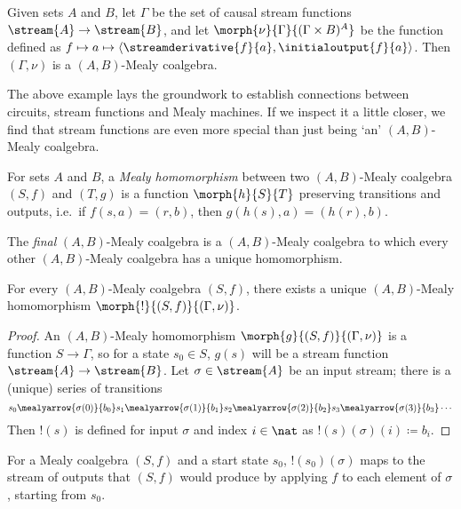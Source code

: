 \documentclass{lmcs}
\begin{document}
\begin{exa}
    Given sets \(A\) and \(B\), let \(\Gamma\) be the set of causal stream
    functions \(\stream{A} \to \stream{B}\), and let
    \(\morph{\nu}{\Gamma}{(\Gamma \times B)^A}\) be the function defined as \(
    f \mapsto a \mapsto \langle{
        \streamderivative{f}{a},\initialoutput{f}{a}
    }\rangle\).
    Then \((\Gamma,\nu)\) is a \((A,B)\)-Mealy coalgebra.
\end{exa}

The above example lays the groundwork to establish connections between circuits,
stream functions and Mealy machines.
If we inspect it a little closer, we find that stream functions are even more
special than just being `an' \((A,B)\)-Mealy coalgebra.

\begin{defi}\label{def:mealy-homomorphism}
    For sets \(A\) and \(B\), a \emph{Mealy homomorphism} between two
    \((A,B)\)-Mealy coalgebra \((S,f)\) and \((T,g)\) is a function
    \(\morph{h}{S}{T}\) preserving transitions and
    outputs, i.e.\ if \(f(s,a) = (r,b)\), then \(g(h(s),a) = (h(r),b)\).
\end{defi}

The \emph{final} \((A,B)\)-Mealy coalgebra is a \((A,B)\)-Mealy coalgebra to
which every other \((A,B)\)-Mealy coalgebra has a unique homomorphism.

\begin{prop}
    \label{prop:final-coalgebra}
    For every \((A,B)\)-Mealy coalgebra \((S,f)\), there exists a
    unique \((A,B)\)-Mealy homomorphism \(\morph{{!}}{(S,f)}{(\Gamma,\nu)}\).
\end{prop}
\begin{proof}
    An \((A,B)\)-Mealy homomorphism \(\morph{g}{(S, f)}{(\Gamma, \nu)}\) is a
    function \(S \to \Gamma\), so for a state \(s_0 \in S\), \(g(s)\) will be a
    stream function \(\stream{A} \to \stream{B}\).
    Let \(\sigma \in \stream{A}\) be an input stream; there is a (unique) series
    of transitions \[
        s_0
        \mealyarrow{\sigma(0)}{b_0}
        s_1
        \mealyarrow{\sigma(1)}{b_1}
        s_2
        \mealyarrow{\sigma(2)}{b_2}
        s_3
        \mealyarrow{\sigma(3)}{b_3}
        \cdots
    \]
    Then \(!(s)\) is defined for input \(\sigma\) and
    index \(i \in \nat\) as \(!(s)(\sigma)(i) \coloneqq b_i\).
\end{proof}

For a Mealy coalgebra \((S, f)\) and a start state \(s_0\),
\(!(s_0)(\sigma)\) maps to the stream of outputs that \((S, f)\) would produce
by applying \(f\) to each element of \(\sigma\), starting from \(s_0\).
\end{document}
